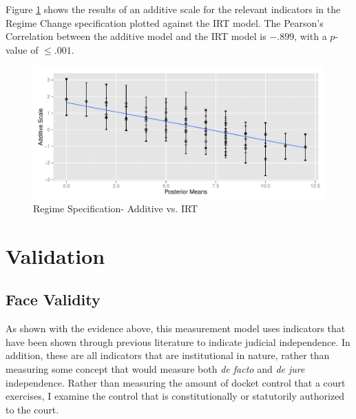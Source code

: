 \documentclass[12pt]{article}
\begin{document}
Figure \ref{fig:regime_additive_ggplot.pdf} shows the results of an additive scale for the relevant indicators in the Regime Change specification plotted against the IRT model.  The Pearson's Correlation between the additive model and the IRT model is $-.899$, with a $p$-value of $\leq.001$.

\begin{figure}[tbh]
	\centering
	\caption{Regime Specification- Additive vs. IRT}
	\label{fig:regime_additive_ggplot.pdf}
	\includegraphics[width=0.7\linewidth]{graphics/regime/regime_additive_ggplot}
\end{figure}

\section{Validation}\label{Validation}
\subsection{Face Validity}
As shown with the evidence above, this measurement model uses indicators that have been shown through previous literature to indicate judicial independence. In addition, these are all indicators that are institutional in nature, rather than measuring some concept that would measure both \textit{de facto} and \textit{de jure} independence. Rather than measuring the amount of docket control that a court exercises, I examine the control that is constitutionally or statutorily authorized to the court.

\end{document}
